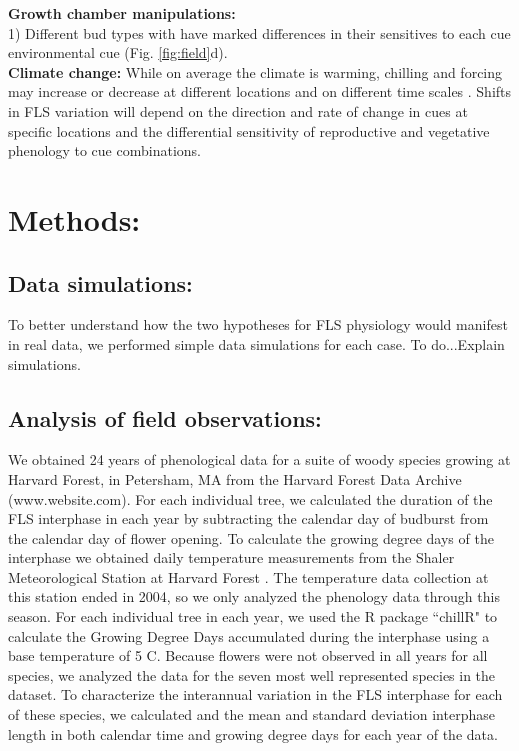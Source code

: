 \documentclass[11pt]{article}
\begin{document}
\noindent \textbf{Growth chamber manipulations:}\\ 1) Different bud types with have marked differences in their sensitives to each cue environmental cue (Fig. \ref{fig:field}d).\\

\noindent \textbf{Climate change:} While on average the climate is warming, chilling and forcing may increase or decrease at different locations and on different time scales \citep{Ettinger}. Shifts in FLS variation will depend on the direction and rate of change in cues at specific locations and the differential sensitivity of reproductive and vegetative phenology to cue combinations.\\
\section{Methods:}
\subsection*{Data simulations:}
\noindent To better understand how the two hypotheses for FLS physiology would manifest in real data, we performed simple data simulations for each case.  To do...Explain simulations.

\subsection*{Analysis of field observations:}
\noindent We obtained 24 years of phenological data for a suite of woody species growing at Harvard Forest, in Petersham, MA \citep{Okeefe2015} from the Harvard Forest Data Archive (www.website.com).  For each individual tree, we calculated the duration of the FLS interphase in each year by subtracting the calendar day of budburst from the calendar day of flower opening. To calculate the growing degree days of the interphase we obtained daily temperature measurements from the Shaler Meteorological Station at Harvard Forest \citep{}. The temperature data collection at this station ended in 2004, so we only analyzed the phenology data through this season. For each individual tree in each year, we used the R package ``chillR" \citep{} to calculate the Growing Degree Days accumulated during the interphase using a base temperature of 5 \degree C. Because flowers were not observed in all years for all species, we analyzed the data for the seven most well represented species in the dataset. To characterize the interannual variation in the FLS interphase for each of these species, we calculated and the mean and standard deviation interphase length in both calendar time and growing degree days for each year of the data.
\end{document}
